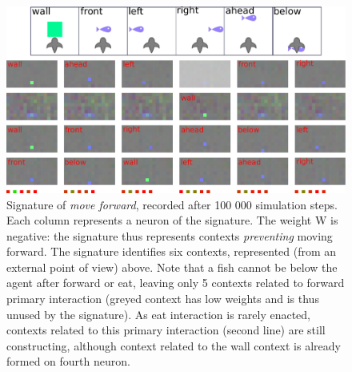 \documentclass[conference]{IEEEtran}
\begin{document}

\begin{figure}[htbp]
\centerline{\includegraphics[scale=0.35]{img/sig_forward.pdf}}
\caption{Signature of \textit{move forward}, recorded after 100 000 simulation steps. Each column represents a neuron of the signature. The weight W is negative: the signature thus represents contexts \textit{preventing} moving forward. The signature identifies six contexts, represented (from an external point of view) above. Note that a fish cannot be below the agent after forward or eat, leaving only 5 contexts related to forward primary interaction (greyed context has low weights and is thus unused by the signature). As eat interaction is rarely enacted, contexts related to this primary interaction (second line) are still constructing, although context related to the wall context is already formed on fourth neuron.}
\label{fig}
\end{figure}
\end{document}

